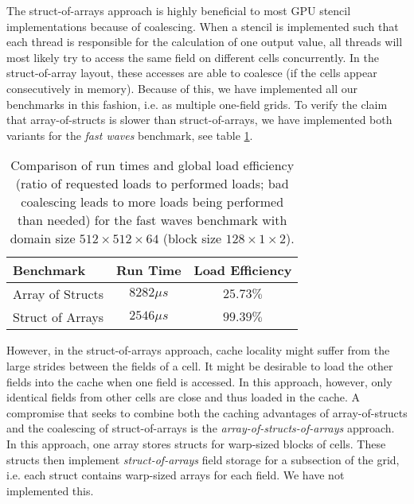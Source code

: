 The struct-of-arrays approach is highly beneficial to most GPU stencil implementations because of coalescing. When a stencil is implemented such that each thread is responsible for the calculation of one output value, all threads will most likely try to access the same field on different cells concurrently. In the struct-of-array layout, these accesses are able to coalesce (if the cells appear consecutively in memory).  Because of this, we have implemented all our benchmarks in this fashion, i.e. as multiple one-field grids. To verify the claim that array-of-structs is slower than struct-of-arrays, we have implemented both variants for the \emph{fast waves} benchmark, see table \ref{tab:array-of-structs}.

\begin{table}
	\begin{center}
    \begin{tabular}{l c c}
        \hline
        \textbf{Benchmark} & \textbf{Run Time} & \textbf{Load Efficiency} \\
        \hline
        \hline
        Array of Structs & $8282 \mu s$ & $25.73\%$\\
        Struct of Arrays & $2546 \mu s$ & $99.39\%$ \\
        \hline
    \end{tabular}
	\end{center}
    \caption{\label{tab:array-of-structs} Comparison of run times and global load efficiency (ratio of requested loads to performed loads; bad coalescing leads to more loads being performed than needed) for the fast waves benchmark with domain size $512\times 512\times 64$ (block size $128\times 1\times 2$).}
\end{table}

However, in the struct-of-arrays approach, cache locality might suffer from the large strides between the fields of a cell. It might be desirable to load the other fields into the cache when one field is accessed. In this approach, however, only identical fields from other cells are close and thus loaded in the cache. A compromise that seeks to combine both the caching advantages of array-of-structs and the coalescing of struct-of-arrays is the \emph{array-of-structs-of-arrays} approach. In this approach, one array stores structs for warp-sized blocks of cells. These structs then implement \emph{struct-of-arrays} field storage for a subsection of the grid, i.e. each struct contains warp-sized arrays for each field. We have not implemented this.